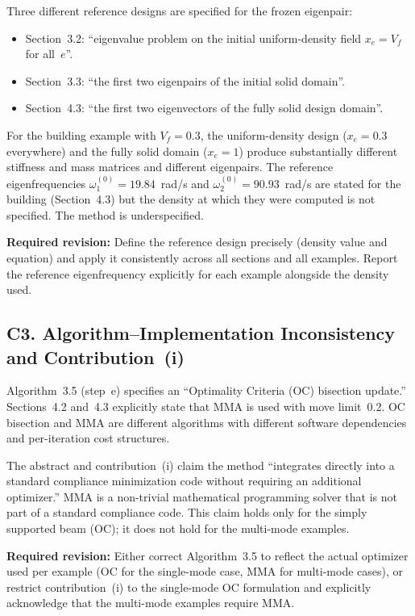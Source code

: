 \documentclass[11pt,a4paper]{article}
\begin{document}
Three different reference designs are specified for the frozen eigenpair:
\begin{itemize}[nosep]
  \item Section~3.2: ``eigenvalue problem on the initial uniform-density field $x_e = V_f$
    for all~$e$''.
  \item Section~3.3: ``the first two eigenpairs of the initial solid domain''.
  \item Section~4.3: ``the first two eigenvectors of the fully solid design domain''.
\end{itemize}
For the building example with $V_f=0.3$, the uniform-density design
($x_e = 0.3$ everywhere) and the fully solid domain ($x_e = 1$) produce substantially
different stiffness and mass matrices and different eigenpairs. The reference
eigenfrequencies $\omega_1^{(0)} = 19.84$~rad/s and $\omega_2^{(0)} = 90.93$~rad/s are
stated for the building (Section~4.3) but the density at which they were computed is not
specified. The method is underspecified.

\textbf{Required revision:} Define the reference design precisely (density value and
equation) and apply it consistently across all sections and all examples. Report the
reference eigenfrequency explicitly for each example alongside the density used.

\subsection*{C3.\; Algorithm--Implementation Inconsistency and Contribution~(i)}

Algorithm~3.5 (step~e) specifies an ``Optimality Criteria (OC) bisection update.''
Sections~4.2 and~4.3 explicitly state that MMA is used with move limit~0.2. OC bisection
and MMA are different algorithms with different software dependencies and per-iteration
cost structures.

The abstract and contribution~(i) claim the method ``integrates directly into a standard
compliance minimization code without requiring an additional optimizer.'' MMA is a
non-trivial mathematical programming solver that is not part of a standard compliance
code. This claim holds only for the simply supported beam (OC); it does not hold for the
multi-mode examples.

\textbf{Required revision:} Either correct Algorithm~3.5 to reflect the actual optimizer
used per example (OC for the single-mode case, MMA for multi-mode cases), or restrict
contribution~(i) to the single-mode OC formulation and explicitly acknowledge that the
multi-mode examples require MMA.
\end{document}
